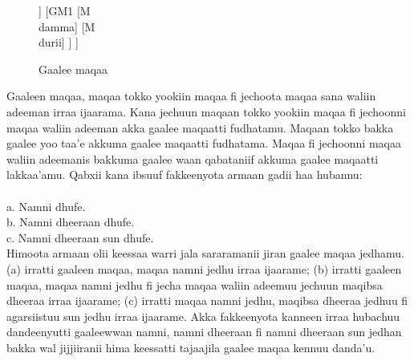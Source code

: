 \documentclass[11pt,b5paper]{book}
\begin{document}
\begin{figure}[H]										
	\caption{Gaalee maqaa}
	\centering
	\begin{forest}
		[GMG
			[GM1
				[M\\daadhii]
			]
			[GM1
				[M\\damma]
				[M\\durii]
			]
		]
	\end{forest}
\end{figure}

Gaaleen maqaa, maqaa tokko yookiin maqaa fi jechoota maqaa sana waliin adeeman irraa ijaarama. Kana jechuun maqaan
tokko yookiin maqaa fi jechoonni maqaa waliin adeeman akka gaalee maqaatti fudhatamu. Maqaan tokko bakka gaalee yoo
taa’e akkuma gaalee maqaatti fudhatama. Maqaa fi jechoonni maqaa waliin adeemanis bakkuma gaalee waan qabataniif
akkuma gaalee maqaatti lakkaa’amu. Qabxii kana ibsuuf fakkeenyota armaan gadii haa hubannu: \\
\\
a. Namni dhufe.\\
b. Namni dheeraan dhufe.\\
c. Namni dheeraan sun dhufe.\\

Himoota armaan olii keessaa warri jala sararamanii jiran gaalee maqaa jedhamu. (a) irratti gaaleen maqaa, maqaa
namni jedhu irraa ijaarame; (b) irratti gaaleen maqaa, maqaa namni jedhu fi jecha maqaa waliin adeemuu jechuun maqibsa dheeraa irraa ijaarame; (c) irratti maqaa namni jedhu, maqibsa dheeraa jedhuu fi agarsiistuu sun jedhu irraa ijaarame. Akka fakkeenyota kanneen irraa hubachuu dandeenyutti gaaleewwan namni, namni dheeraan fi namni
dheeraan sun jedhan bakka wal jijjiiranii hima keessatti tajaajila gaalee maqaa kennuu danda’u.
\end{document}
